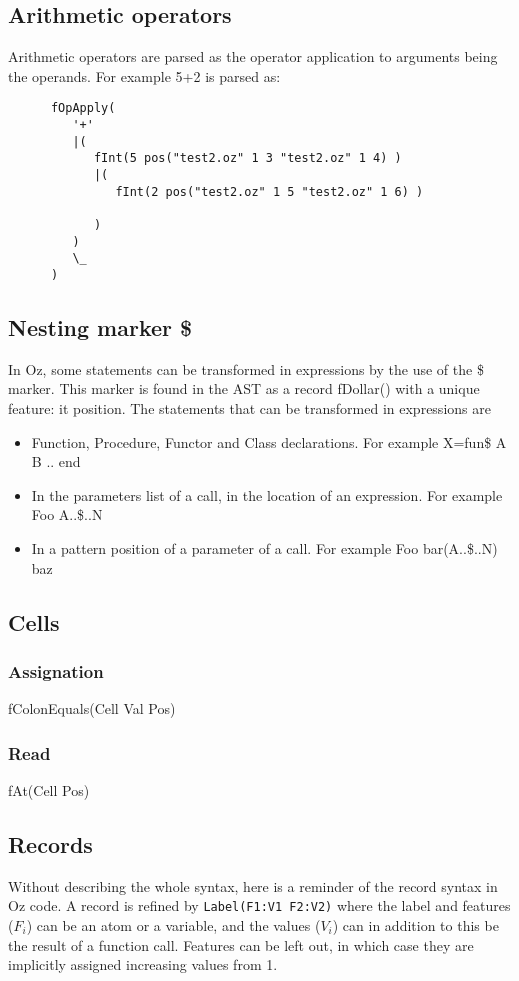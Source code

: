 \documentclass[a4paper]{memoir}
\begin{document}
\subsection{Arithmetic operators}
Arithmetic operators are parsed as the operator application to arguments being the operands. For example
5+2 is parsed as:
\begin{lstlisting}
      fOpApply(
         '+'
         |(
            fInt(5 pos("test2.oz" 1 3 "test2.oz" 1 4) )
            |(
               fInt(2 pos("test2.oz" 1 5 "test2.oz" 1 6) )
               
            )
         )
         \_
      )

\end{lstlisting}
\subsection{Nesting marker \$}
In Oz, some statements can be transformed in expressions by the use of the \$ marker. This marker is found in the AST as a record fDollar() with a unique feature: it position.
The statements that can be transformed in expressions are
\begin{itemize}
  \item Function, Procedure, Functor and Class declarations. For example X=fun{\$ A B} .. end
  \item In the parameters list of a call, in the location of an expression. For example {Foo A..\$..N}
  \item In a pattern position of a parameter of a call. For example {Foo bar(A..\$..N) baz}
\end{itemize}

\subsection{Cells}
\subsubsection{Assignation}
fColonEquals(Cell Val Pos) %
\subsubsection{Read}
fAt(Cell Pos) %
\subsection{Records}
Without describing the whole syntax, here is a reminder of the record syntax in Oz code. A record is refined by \lstinline!Label(F1:V1 F2:V2)! where the label and features ($F_i$) can be an atom or a variable, and the values ($V_i$) can in addition to this be the result of a function call. Features can be left out, in which case they are implicitly assigned increasing values from 1.
\end{document}
